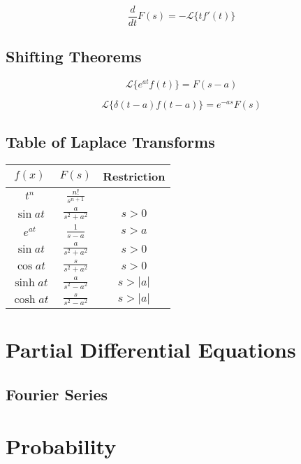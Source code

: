 $$\frac{d}{dt}F(s) = -\mathscr{L}\{tf'(t)\}$$

\subsection{Shifting Theorems}

$$ \mathscr{L}\{ e^{at}f(t) \} = F(s-a)$$

$$ \mathscr{L}\{ \delta(t - a)f(t-a) \} = e^{-as}F(s)$$

\subsection{Table of Laplace Transforms}

\begin{center}

	\begin{tabular}{c|c|c}
		$f(x)$      & $F(s)$                                   & Restriction \\ \hline
		$t^{n}$     & $\displaystyle{\frac{n!}{s^{n+1}}}$      &             \\ \hline
		$\sin{at}$  & $\displaystyle{\frac{a}{s^{2} + a^{2}}}$ & $s > 0$     \\ \hline
		$e^{at}$    & $\displaystyle{\frac{1}{s - a}}$         & $s > a$     \\ \hline
		$\sin{at}$  & $\displaystyle{\frac{a}{s^{2} + a^{2}}}$ & $s > 0$     \\ \hline
		$\cos{at}$  & $\displaystyle{\frac{s}{s^{2} + a^{2}}}$ & $s > 0$     \\ \hline
		$\sinh{at}$ & $\displaystyle{\frac{a}{s^{2} - a^{2}}}$ & $s > |a|$   \\ \hline
		$\cosh{at}$ & $\displaystyle{\frac{s}{s^{2} - a^{2}}}$ & $s > |a|$
	\end{tabular}

\end{center}

\pagebreak

\section{Partial Differential Equations}

\subsection{Fourier Series}

\section{Probability}

